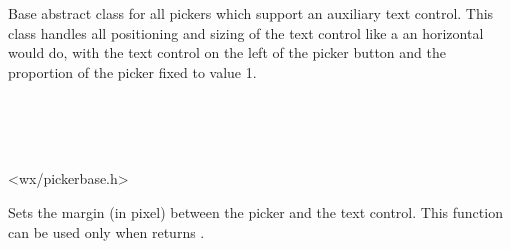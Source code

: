 
\section{}\label{wxpickerbase}

Base abstract class for all pickers which support an auxiliary text control.
This class handles all positioning and sizing of the text control like a
an horizontal  would do, with the text control on
the left of the picker button and the proportion of the picker fixed to value 1.


\\
\\
\\


<wx/pickerbase.h>


\twocolwidtha{5cm}%
\begin{twocollist}\itemsep=0pt
\end{twocollist}





\label{wxpickerbasesetinternalmargin}


Sets the margin (in pixel) between the picker and the text control.
This function can be used only when  returns \true.


